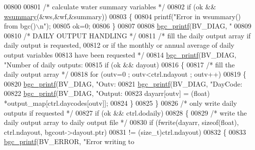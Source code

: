 \begin{DoxyCode}
{{{{{{{{{{{{{{{{{{{{{{{{{{{{{{{{{{00800 
00801             \textcolor{comment}{/* calculate water summary variables */}
00802             \textcolor{keywordflow}{if} (ok && \hyperlink{summary_8c_a6f21695898e69d2e04041da9158e38fa}{wsummary}(&ws,&wf,&summary))
00803             \{
00804                 printf(\textcolor{stringliteral}{"Error in wsummary() from bgc()\(\backslash\)n"});
00805                 ok=0;
00806             \}
00807 
00808             \hyperlink{bgc__io_8c_af287cce6e2aede1ce337de9319e80d0d}{bgc\_printf}(BV\_DIAG, \textcolor{stringliteral}{"%
00809 
00810             \textcolor{comment}{/* DAILY OUTPUT HANDLING */}
00811             \textcolor{comment}{/* fill the daily output array if daily output is requested,}
00812 \textcolor{comment}{            or if the monthly or annual average of daily output variables}
00813 \textcolor{comment}{            have been requested */}
00814             \hyperlink{bgc__io_8c_af287cce6e2aede1ce337de9319e80d0d}{bgc\_printf}(BV\_DIAG, \textcolor{stringliteral}{"Number of daily outputs: %
00815             \textcolor{keywordflow}{if} (ok && dayout)
00816             \{
00817                 \textcolor{comment}{/* fill the daily output array */}
00818                 \textcolor{keywordflow}{for} (outv=0 ; outv<ctrl.ndayout ; outv++)
00819                 \{
00820                     \hyperlink{bgc__io_8c_af287cce6e2aede1ce337de9319e80d0d}{bgc\_printf}(BV\_DIAG, \textcolor{stringliteral}{"Outv: %
00821                     \hyperlink{bgc__io_8c_af287cce6e2aede1ce337de9319e80d0d}{bgc\_printf}(BV\_DIAG, \textcolor{stringliteral}{"DayCode: %
00822                     \hyperlink{bgc__io_8c_af287cce6e2aede1ce337de9319e80d0d}{bgc\_printf}(BV\_DIAG, \textcolor{stringliteral}{"Output: %
00823                     dayarr[outv] = (float) *output\_map[ctrl.daycodes[outv]];
00824                 \}
00825             \}
00826             \textcolor{comment}{/* only write daily outputs if requested */}
00827             \textcolor{keywordflow}{if} (ok && ctrl.dodaily)
00828             \{
00829                 \textcolor{comment}{/* write the daily output array to daily output file */}
00830                 \textcolor{keywordflow}{if} (fwrite(dayarr, \textcolor{keyword}{sizeof}(\textcolor{keywordtype}{float}), ctrl.ndayout, bgcout->dayout.ptr)
00831                     != (size\_t)ctrl.ndayout)
00832                 \{
00833                     \hyperlink{bgc__io_8c_af287cce6e2aede1ce337de9319e80d0d}{bgc\_printf}(BV\_ERROR, \textcolor{stringliteral}{"Error writing to %
}}}}}}}}}}}}}}}}}}}}}}}}}}}}}}}}}}}}}}}}
\end{DoxyCode}

